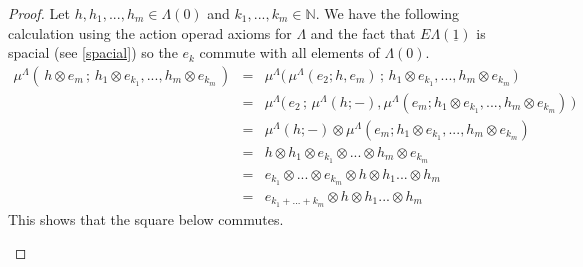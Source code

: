 \documentclass{amsbook} %
\newcommand{\EL}{E\Lambda}
\numberwithin{section}{chapter}
\begin{document}
\begin{proof}
Let $h, h_1, ..., h_m \in \Lambda(0)$ and $k_1, ..., k_m \in \mathbb{N}$. We have the following calculation using the action operad axioms for $\Lambda$ and the fact that $\EL(\underline{1})$ is spacial (see \cref{spacial}) so the $e_k$ commute with all elements of $\Lambda(0)$.
\[ \begin{array}{rll}
		\mu^{\Lambda}( \, h \otimes e_m \, ; \, h_1 \otimes e_{k_1}, ..., h_m \otimes e_{k_m} \, ) & = & \mu^{\Lambda}\big( \, \mu^{\Lambda}(e_2; h, e_m) \, ; \, h_1 \otimes e_{k_1}, ..., h_m \otimes e_{k_m} \, \big) \\
		& = & \mu^{\Lambda}\big( \, e_2 \, ; \, \mu^{\Lambda}(h;-), \mu^{\Lambda}(e_m; h_1 \otimes e_{k_1}, ..., h_m \otimes e_{k_m}) \, \big) \\
		& = & \mu^{\Lambda}(h;-) \otimes \mu^{\Lambda}(e_m; h_1 \otimes e_{k_1}, ..., h_m \otimes e_{k_m})  \\
		& = & h \otimes h_1 \otimes e_{k_1} \otimes ... \otimes h_m \otimes e_{k_m} \\
		& = & e_{k_1} \otimes ... \otimes e_{k_m} \otimes h \otimes h_1 ... \otimes h_m \\
		& = & e_{k_1+...+k_m} \otimes h \otimes h_1 ... \otimes h_m
		\end{array}
\]
This shows that the square below commutes.
\begin{center}
\end{center}	

\end{proof}
\end{document}
